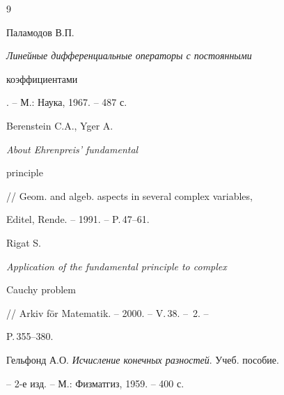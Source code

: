 \begin{thebibliography}{9}




Паламодов В.П. {\em Линейные дифференциальные операторы с постоянными


коэффициентами}. -- М.: Наука, 1967. -- 487 с.




Berenstein C.A., Yger A. {\em About Ehrenpreis' fundamental


principle} // Geom. and algeb. aspects in several complex variables,




Editel, Rende. -- 1991. -- P.\,47--61.




Rigat S. {\em Application of the fundamental principle to complex


Cauchy problem} // Arkiv f\"or Matematik. -- 2000. -- V.\,38. -- \No\,2. --


P.\,355--380.




Гельфонд А.О. {\em Исчисление конечных разностей}. Учеб. пособие.


-- 2-е изд. -- М.: Физматгиз, 1959. -- 400 с.





\end{thebibliography}





\vskip 0.5cm














\label{end}





